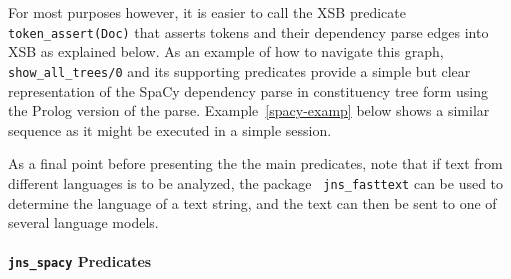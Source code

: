 For most purposes however, it is easier to call the XSB predicate {\tt
  token\_assert(Doc)} that asserts tokens and their dependency parse
edges into XSB as explained below.  As an example of how to navigate
this graph, {\tt show\_all\_trees/0} and its supporting predicates
provide a simple but clear representation of the SpaCy dependency
parse in constituency tree form using the Prolog version of the parse.
Example~\ref{spacy-examp} below shows a similar sequence as it might
be executed in a simple session.



As a final point before presenting the the main predicates, note that
if text from different languages is to be analyzed, the package {\tt
  jns\_fasttext} can be used to determine the language of a text
string, and the text can then be sent to one of several language
models. 

\paragraph{{\tt jns\_spacy} Predicates}

